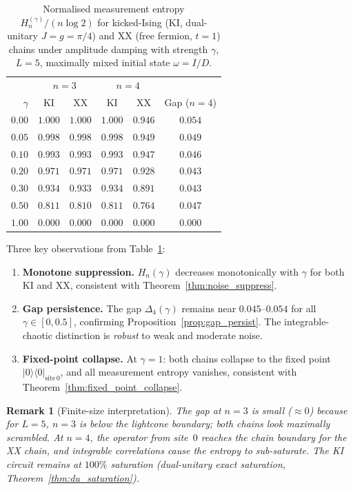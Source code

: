 \documentclass[12pt,a4paper]{article}
\newtheorem{remark}[theorem]{Remark}
\begin{document}
\begin{table}[h]
\centering
\caption{Normalised measurement entropy $H_n^{(\gamma)}/(n\log 2)$ for
kicked-Ising (KI, dual-unitary $J=g=\pi/4$) and XX (free fermion, $t=1$)
chains under amplitude damping with strength $\gamma$, $L=5$, maximally
mixed initial state $\omega=I/D$.}
\begin{tabular}{r|cc|cc|c}
\hline
 & \multicolumn{2}{c|}{$n=3$} & \multicolumn{2}{c|}{$n=4$} & \\
$\gamma$ & KI & XX & KI & XX & Gap ($n=4$) \\
\hline
$0.00$ & $1.000$ & $1.000$ & $1.000$ & $0.946$ & $0.054$ \\
$0.05$ & $0.998$ & $0.998$ & $0.998$ & $0.949$ & $0.049$ \\
$0.10$ & $0.993$ & $0.993$ & $0.993$ & $0.947$ & $0.046$ \\
$0.20$ & $0.971$ & $0.971$ & $0.971$ & $0.928$ & $0.043$ \\
$0.30$ & $0.934$ & $0.933$ & $0.934$ & $0.891$ & $0.043$ \\
$0.50$ & $0.811$ & $0.810$ & $0.811$ & $0.764$ & $0.047$ \\
$1.00$ & $0.000$ & $0.000$ & $0.000$ & $0.000$ & $0.000$ \\
\hline
\end{tabular}
\label{tab:noise}
\end{table}

Three key observations from Table~\ref{tab:noise}:
\begin{enumerate}
\item \textbf{Monotone suppression.} $H_n(\gamma)$ decreases monotonically
with $\gamma$ for both KI and XX, consistent with Theorem~\ref{thm:noise_suppress}.

\item \textbf{Gap persistence.}  The gap $\Delta_4(\gamma)$ remains near
$0.045$--$0.054$ for all $\gamma\in[0,0.5]$, confirming
Proposition~\ref{prop:gap_persist}.  The integrable-chaotic distinction is
\emph{robust} to weak and moderate noise.

\item \textbf{Fixed-point collapse.}  At $\gamma=1$: both chains collapse
to the fixed point $|0\rangle\langle 0|_{\mathrm{site\,0}}$, and all
measurement entropy vanishes, consistent with Theorem~\ref{thm:fixed_point_collapse}.
\end{enumerate}

\begin{remark}[Finite-size interpretation]
The gap at $n=3$ is small ($\approx 0$) because for $L=5$, $n=3$ is below
the lightcone boundary; both chains look maximally scrambled.  At $n=4$,
the operator from site~$0$ reaches the chain boundary for the XX chain,
and integrable correlations cause the entropy to sub-saturate.  The KI
circuit remains at $100\%$ saturation (dual-unitary exact
saturation, Theorem~\ref{thm:du_saturation}).
\end{remark}
\end{document}

